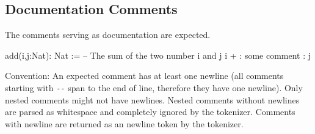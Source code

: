 \subsection{Documentation Comments}

The comments serving as documentation are expected.

\begin{alba}
  add(i,j:Nat): Nat :=
      -- The sum of the two number i and j
    i + {: some comment :} j
\end{alba}

Convention: An expected comment has at least one newline (all comments
starting with \verb!--! span to the end of line, therefore they have one
newline). Only nested comments might not have newlines. Nested comments
without newlines are parsed as whitespace and completely ignored by the
tokenizer. Comments with newline are returned as an newline token by the
tokenizer.






